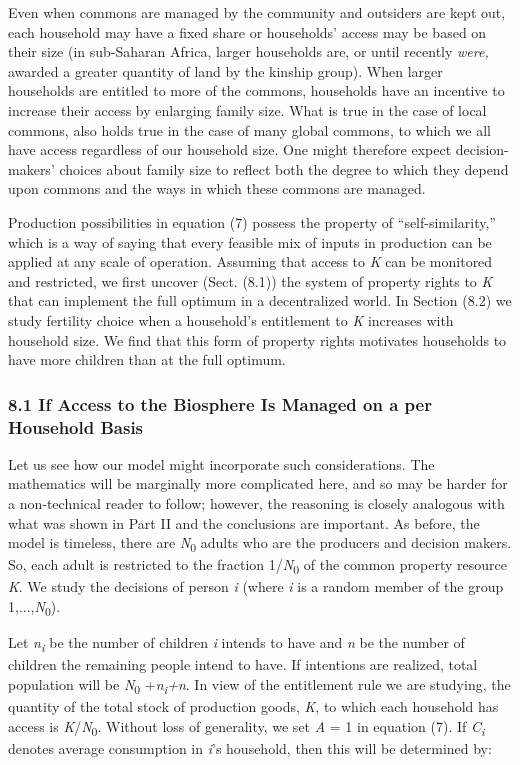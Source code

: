 \documentclass[man,11pt,a4paper,floatsintext]{apa7}
\begin{document}
Even when commons are managed by the community and outsiders are kept out, each household may have a fixed share or households' access may be based on their size (in sub-Saharan Africa, larger households are, or until recently \textit{were,} awarded a greater quantity of land by the kinship group). When larger households are entitled to more of the commons, households have an incentive to increase their access by enlarging family size. What is true in the case of local commons, also holds true in the case of many global commons, to which we all have access regardless of our household size. One might therefore expect decision-makers' choices about family size to reflect both the degree to which they depend upon commons and the ways in which these commons are managed.

Production possibilities in equation (7) possess the property of ``self-similarity,'' which is a way of saying that every feasible mix of inputs in production can be applied at any scale of operation. Assuming that access to \textit{K} can be monitored and restricted, we first uncover (Sect. (8.1)) the system of property rights to \textit{K} that can implement the full optimum in a decentralized world. In Section (8.2) we study fertility choice when a household's entitlement to \textit{K} increases with household size. We find that this form of property rights motivates households to have more children than at the full optimum.

\subsubsection{8.1 If Access to the Biosphere Is Managed on a per Household Basis}

Let us see how our model might incorporate such considerations. The mathematics will be marginally more complicated here, and so may be harder for a non-technical reader to follow; however, the reasoning is closely analogous with what was shown in Part II and the conclusions are important. As before, the model is timeless, there are \textit{N}\textsubscript{0} adults who are the producers and decision makers. So, each adult is restricted to the fraction 1/\textit{N}\textsubscript{0} of the common property resource \textit{K}. We study the decisions of person \textit{i} (where \textit{i} is a random member of the group 1,...,\textit{N}\textsubscript{0}).

Let \textit{n}\textsubscript{\textit{i}} be the number of children \textit{i} intends to have and \textit{n} be the number of children the remaining people intend to have. If intentions are realized, total population will be \textit{N}\textsubscript{0 }+\textit{n}\textsubscript{\textit{i}}\textit{+n}. In view of the entitlement rule we are studying, the quantity of the total stock of production goods, \textit{K}, to which each household has access is \textit{K}/\textit{N}\textsubscript{0}. Without loss of generality, we set \textit{A} = 1 in equation (7). If \textit{C}\textsubscript{\textit{i}} denotes average consumption in \textit{i}'s household, then this will be determined by:
\end{document}
